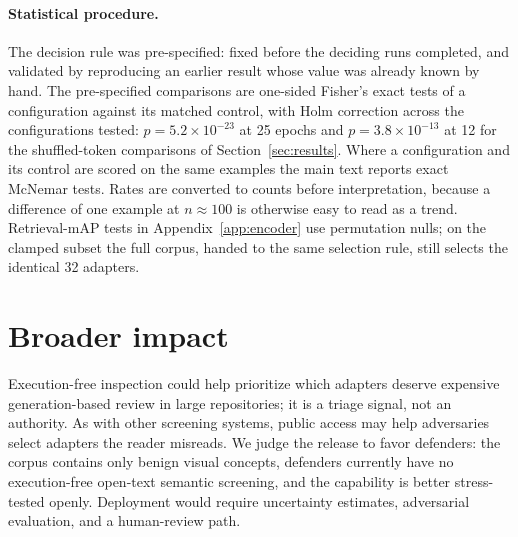\documentclass{article}
\begin{document}
\paragraph{Statistical procedure.} The decision rule was pre-specified: fixed before the deciding
runs completed, and validated by reproducing an earlier result whose value was already known by
hand. The pre-specified comparisons are one-sided Fisher's exact tests of a configuration against
its matched control, with Holm correction across the configurations tested: $p = 5.2\times10^{-23}$
at 25 epochs and $p = 3.8\times10^{-13}$ at 12 for the shuffled-token comparisons of
Section~\ref{sec:results}. Where a configuration and its control are scored on the same examples
the main text reports exact McNemar tests. Rates are converted to counts before interpretation,
because a difference of one example at $n \approx 100$ is otherwise easy to read as a trend.
Retrieval-mAP tests in Appendix~\ref{app:encoder} use permutation nulls; on the clamped subset the
full corpus, handed to the same selection rule, still selects the identical 32 adapters.

\section{Broader impact}
\label{app:impact}

Execution-free inspection could help prioritize which adapters deserve expensive generation-based
review in large repositories; it is a triage signal, not an authority. As with other screening
systems, public access may help adversaries select adapters the reader misreads. We judge the
release to favor defenders: the corpus contains only benign visual concepts, defenders currently
have no execution-free open-text semantic screening, and the capability is better stress-tested
openly. Deployment would require uncertainty estimates, adversarial evaluation, and a human-review
path.
\end{document}
